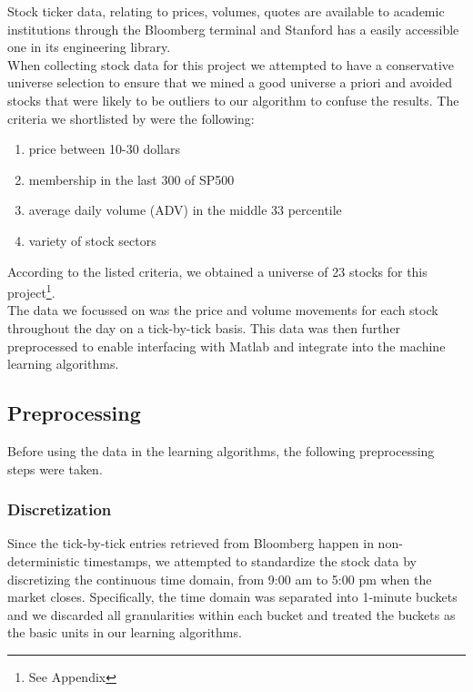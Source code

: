 \documentclass[10pt,twocolumn,letterpaper]{article}
\begin{document}
Stock ticker data, relating to prices, volumes, quotes are available to academic institutions through the Bloomberg terminal and Stanford has a easily accessible one in its engineering library.\\

When collecting stock data for this project we attempted to have a conservative universe selection to ensure that we mined a good universe a priori and avoided stocks that were likely to be outliers to our algorithm to confuse the results. The criteria we shortlisted by were the following:
\begin{enumerate}
\item price between 10-30 dollars
\item membership in the last 300 of SP500
\item average daily  volume (ADV) in the middle 33 percentile
\item variety of stock sectors
\end{enumerate}

According to the listed criteria, we obtained a universe of 23 stocks for this project\footnote{See Appendix}.\\

The data we focussed on was the price and volume movements for each stock throughout the day on a tick-by-tick basis. This data was then further preprocessed to enable interfacing with Matlab and integrate into the machine learning algorithms.

\subsection{Preprocessing}
Before using the data in the learning algorithms, the following preprocessing steps were taken.
\subsubsection{Discretization}
Since the tick-by-tick entries retrieved from Bloomberg happen in non-deterministic timestamps, we attempted to standardize the stock data by discretizing the continuous time domain, from 9:00 am to 5:00 pm when the market closes. Specifically, the time domain was separated into 1-minute buckets and we discarded all granularities within each bucket and treated the buckets as the basic units in our learning algorithms.
 
\end{document}
